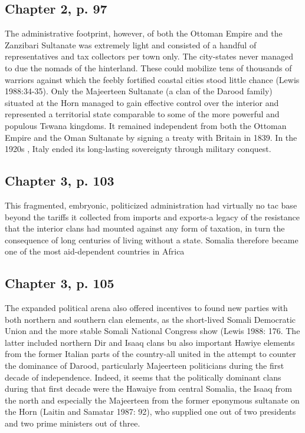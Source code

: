 \documentclass[12pt]{article}
\begin{document}
\subsection{Chapter 2, p. 97}
The administrative footprint, however, of both the Ottoman Empire and the
Zanzibari Sultanate was extremely light and consisted of a handful of
representatives and tax collectors per town only.  The city-states never managed
to due the nomads of the hinterland.  These could mobilize tens of thousands
of warriors against which the feebly fortified coastal cities stood little
chance (Lewis 1988:34-35).  Only the Majeerteen Sultanate (a clan of the Darood
family) situated at the Horn managed to gain effective control over the interior
and represented a territorial state comparable to some of the more powerful and
populous Tswana kingdoms.  It remained independent from both the Ottoman Empire
and the Oman Sultanate by signing a treaty with Britain in 1839.  In the 1920s ,
Italy ended its long-lasting sovereignty through military conquest.

\subsection{Chapter 3, p. 103}

This fragmented, embryonic, politicized administration had virtually no tac base
beyond the tariffs it collected from imports and exports-a legacy of the
resistance that the interior clans had mounted against any form of taxation, in
turn the consequence of long centuries of living without a state.  Somalia
therefore became one of the most aid-dependent countries in Africa

\subsection{Chapter 3, p. 105}

The expanded political arena also offered incentives to found new parties with
both northern and southern clan elements, as the short-lived Somali Democratic
Union and the more stable Somali National Congress show (Lewis 1988: 176.  The
latter included northern Dir and Isaaq clans bu also important Hawiye elements
from the former Italian parts of the country-all united in the attempt to
counter the dominance of Darood, particularly Majeerteen politicians during the
first decade of independence.  Indeed, it seems that the politically dominant
clans during that first decade were the Hawaiye from central Somalia, the Isaaq
from the north and especially the Majeerteen from the former eponymous sultanate
on the Horn (Laitin and Samatar 1987: 92), who supplied one out of two
presidents and two prime ministers out of three.
\end{document}
